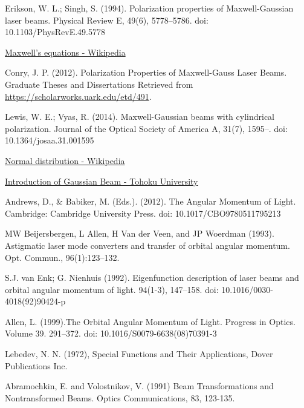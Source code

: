 \documentclass[11pt,a4paper]{article}
\numberwithin{equation}{section}
\begin{document}
\begin{thebibliography}{999}
	Erikson, W. L.; Singh, S. (1994). Polarization properties of Maxwell-Gaussian laser beams. Physical Review E, 49(6), 5778–5786. doi: 10.1103/PhysRevE.49.5778
	
	\href{https://en.wikipedia.org/wiki/Maxwell's_equations}{Maxwell's equations - Wikipedia}
	
	
	Conry, J. P. (2012). Polarization Properties of Maxwell-Gauss Laser Beams. Graduate Theses and Dissertations Retrieved from \href{https://scholarworks.uark.edu/etd/491}{https://scholarworks.uark.edu/etd/491}.
	
	 Lewis, W. E.; Vyas, R. (2014). Maxwell-Gaussian beams with cylindrical polarization. Journal of the Optical Society of America A, 31(7), 1595–. doi: 10.1364/josaa.31.001595 
	
	\href{https://en.wikipedia.org/wiki/Normal_distribution}{Normal distribution - Wikipedia}
	
	\href{https://flex.phys.tohoku.ac.jp/~rsaito/saito20-GaussianBeam.pdf}{Introduction of Gaussian Beam - Tohoku University}
	
	Andrews, D., \& Babiker, M. (Eds.). (2012). The Angular Momentum of Light. Cambridge: Cambridge University Press. doi: 10.1017/CBO9780511795213
	
	
	MW Beijersbergen, L Allen, H Van der Veen, and JP Woerdman (1993). Astigmatic laser mode converters and transfer of orbital angular momentum. Opt. Commun., 96(1):123–132.
	
	 S.J. van Enk; G. Nienhuis (1992). Eigenfunction description of laser beams and orbital angular momentum of light. 94(1-3), 147–158. doi: 10.1016/0030-4018(92)90424-p     
	 
	 Allen, L. (1999).The Orbital Angular Momentum of Light. Progress in Optics.  Volume 39. 291–372. doi: 10.1016/S0079-6638(08)70391-3
	 
	 Lebedev, N. N. (1972), Special Functions and Their Applications, Dover Publications Inc.
	 
	 Abramochkin, E. and Volostnikov, V. (1991) Beam Transformations and Nontransformed Beams. Optics Communications, 83, 123-135. 
	 

\end{thebibliography}
\end{document}
